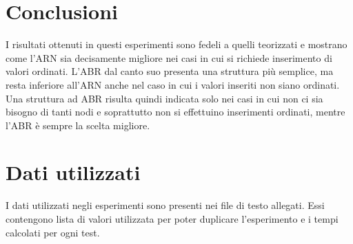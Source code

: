\documentclass{article}
\begin{document}
\FloatBarrier
\section{Conclusioni}
I risultati ottenuti in questi esperimenti sono fedeli a quelli teorizzati e mostrano come l'ARN sia decisamente migliore nei casi in cui si richiede inserimento di valori ordinati. L'ABR dal canto suo presenta una struttura più semplice, ma resta inferiore all'ARN anche nel caso in cui i valori inseriti non siano ordinati.\\ Una struttura ad ABR risulta quindi indicata solo nei casi in cui non ci sia bisogno di tanti nodi e soprattutto non si effettuino inserimenti ordinati, mentre l'ABR è sempre la scelta migliore.
\section{Dati utilizzati}
I dati utilizzati negli esperimenti sono presenti nei file di testo allegati. Essi contengono lista di valori utilizzata per poter duplicare l'esperimento e i tempi calcolati per ogni test.
\end{document}
